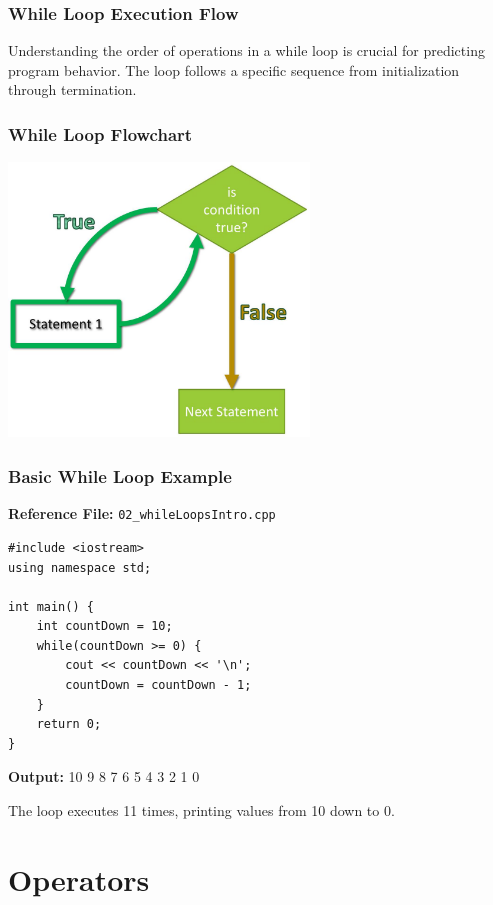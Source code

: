 \documentclass{beamer}
\begin{document}
\begin{frame}
\frametitle{While Loop Execution Flow}
Understanding the order of operations in a while loop is crucial for predicting program behavior. The loop follows a specific sequence from initialization through termination.
\end{frame}

\begin{frame}
\frametitle{While Loop Flowchart}
\includegraphics[width=0.6\textwidth]{../images/While-Loop-Flowchart.jpg}
\end{frame}

\begin{frame}[fragile]
\frametitle{Basic While Loop Example}
\textbf{Reference File:} \texttt{02\_whileLoopsIntro.cpp}

\begin{verbatim}
#include <iostream>
using namespace std;

int main() {
    int countDown = 10;
    while(countDown >= 0) {
        cout << countDown << '\n';
        countDown = countDown - 1;
    }
    return 0;
}
\end{verbatim}

\textbf{Output:} 10 9 8 7 6 5 4 3 2 1 0

The loop executes 11 times, printing values from 10 down to 0.
\end{frame}

\section{Operators}
\end{document}
